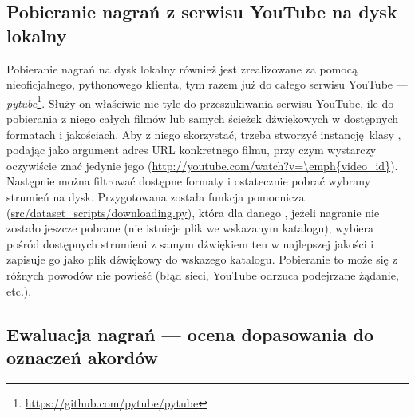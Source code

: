 \subsection{Pobieranie nagrań z serwisu YouTube na dysk lokalny}

Pobieranie nagrań na dysk lokalny również jest zrealizowane za pomocą nieoficjalnego, pythonowego klienta, tym razem już do całego serwisu YouTube --- \emph{pytube}\footnote{\url{https://github.com/pytube/pytube}}. Służy on właściwie nie tyle do przeszukiwania serwisu YouTube, ile do pobierania z niego całych filmów lub samych ścieżek dźwiękowych w dostępnych formatach i jakościach. Aby z niego skorzystać, trzeba stworzyć instancję klasy , podając jako argument adres URL konkretnego filmu, przy czym wystarczy oczywiście znać jedynie jego  (\url{http://youtube.com/watch?v=\emph{video_id}}). Następnie można filtrować dostępne formaty i ostatecznie pobrać wybrany strumień na dysk. Przygotowana została funkcja pomocnicza (\url{src/dataset_scripts/downloading.py}), która dla danego , jeżeli nagranie nie zostało jeszcze pobrane (nie istnieje plik we wskazanym katalogu), wybiera pośród dostępnych strumieni z samym dźwiękiem ten w najlepszej jakości i zapisuje go jako plik dźwiękowy do wskazego katalogu. Pobieranie to może się z różnych powodów nie powieść (błąd sieci, YouTube odrzuca podejrzane żądanie, etc.).

\subsection{Ewaluacja nagrań --- ocena dopasowania do oznaczeń akordów}

